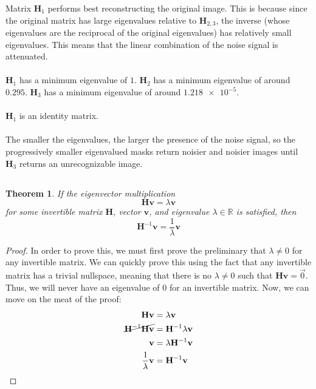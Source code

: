 \documentclass[]{article}
\numberwithin{equation}{section}
\newtheorem{genthm}{Theorem}
\begin{document}
Matrix \(\mathbf{H}_1\) performs best reconstructing the original image. 
This is because since the original matrix has large eigenvalues relative to \(\mathbf{H}_{2,3}\), the inverse (whose eigenvalues are the reciprocal of the original eigenvalues) has relatively small eigenvalues. 
This means that the linear combination of the noise signal is attenuated. \\
\\
\(\mathbf{H}_1\) has a minimum eigenvalue of \(1\). 
\(\mathbf{H}_2\) has a minimum eigenvalue of around \(0.295\). 
\(\mathbf{H}_3\) has a minimum eigenvalue of around \(\num{1.218e-5}\). \\
\\
\(\mathbf{H}_1\) is an identity matrix. \\
\\
The smaller the eigenvalues, the larger the presence of the noise signal, so the progressively smaller eigenvalued masks return noisier and noisier images until \(\mathbf{H}_3\) returns an unrecognizable image. 

\subsection{}

\begin{genthm}
If the eigenvector multiplication 
\begin{equation}
	\mathbf{Hv} = \lambda \mathbf{v}
\end{equation}
for some invertible matrix \(\mathbf{H}\), vector \(\mathbf{v}\), and eigenvalue \(\lambda \in \mathbb{R}\) is satisfied, then 
\begin{equation}
	\mathbf{H}^{-1} \mathbf{v} = \frac{1}{\lambda} \mathbf{v}
\end{equation}
\end{genthm}

\begin{proof}
In order to prove this, we must first prove the preliminary that \(\lambda \neq 0\) for any invertible matrix. 
We can quickly prove this using the fact that any invertible matrix has a trivial nullspace, meaning that there is no \(\lambda \neq 0\) such that \(\mathbf{Hv} = \vec{0}\). 
Thus, we will never have an eigenvalue of 0 for an invertible matrix. Now, we can move on the meat of the proof: 
\begin{align}
	\mathbf{Hv} &= \lambda \mathbf{v} \\
	\cancel{\mathbf{H}^{-1} \mathbf{Hv}} &= \mathbf{H}^{-1} \lambda \mathbf{v} \\
	\mathbf{v} &= \lambda \mathbf{H}^{-1} \mathbf{v} \\
	\frac{1}{\lambda} \mathbf{v} &= \mathbf{H}^{-1} \mathbf{v}
\end{align}
\end{proof}
\end{document}
